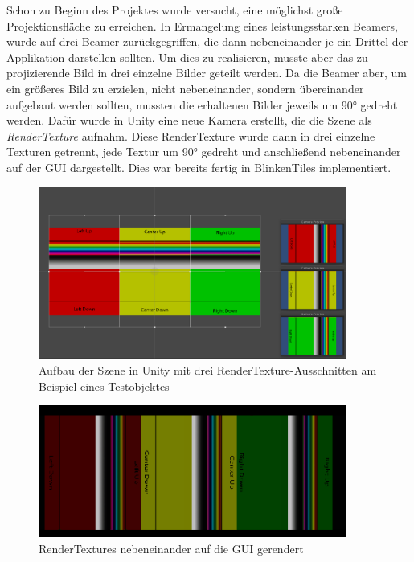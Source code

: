 
Schon zu Beginn des Projektes wurde versucht, eine möglichst große Projektionsfläche zu erreichen. In Ermangelung eines leistungsstarken Beamers, wurde auf drei Beamer zurückgegriffen, die dann nebeneinander je ein Drittel der Applikation darstellen sollten. Um dies zu realisieren, musste aber das zu projizierende Bild in drei einzelne Bilder geteilt werden. Da die Beamer aber, um ein größeres Bild zu erzielen, nicht nebeneinander, sondern übereinander aufgebaut werden sollten, mussten die erhaltenen Bilder jeweils um 90° gedreht werden. Dafür wurde in Unity eine neue Kamera erstellt, die die Szene als \emph{RenderTexture} aufnahm. Diese RenderTexture wurde dann in drei einzelne Texturen getrennt, jede Textur um 90° gedreht und anschließend nebeneinander auf der GUI dargestellt. Dies war bereits fertig in BlinkenTiles implementiert.

\begin{figure}[htbp]
	\centering
		\includegraphics[width=0.9\textwidth]{images/RenderTextureBeispielSzene.PNG}
	\caption{Aufbau der Szene in Unity mit drei RenderTexture-Ausschnitten am Beispiel eines Testobjektes}
	\label{fig:RenderTextureBeispielSzene}
\end{figure}

\begin{figure}[htbp]
	\centering
		\includegraphics[width=0.9\textwidth]{images/RenderTexturesAlsGui.PNG}
	\caption{RenderTextures nebeneinander auf die GUI gerendert}
	\label{fig:RenderTexturesAlsGui}
\end{figure}

